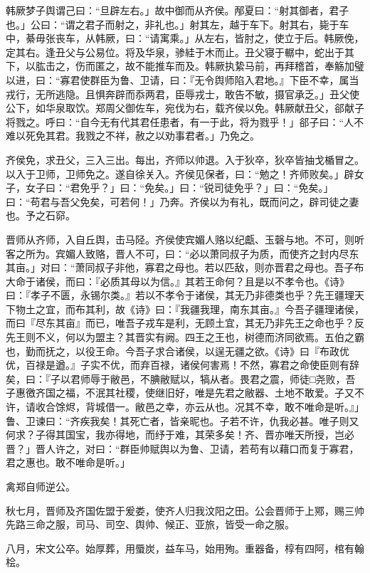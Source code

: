 \documentclass[]{article}
\begin{document}
韩厥梦子舆谓己曰：``旦辟左右。」故中御而从齐侯。邴夏曰：``射其御者，君子也。」公曰：``谓之君子而射之，非礼也。」射其左，越于车下。射其右，毙于车中，綦毋张丧车，从韩厥，曰：``请寓乘。」从左右，皆肘之，使立于后。韩厥俛，定其右。逢丑父与公易位。将及华泉，骖絓于木而止。丑父寝于轏中，蛇出于其下，以肱击之，伤而匿之，故不能推车而及。韩厥执絷马前，再拜稽首，奉觞加璧以进，曰：``寡君使群臣为鲁、卫请，曰：『无令舆师陷入君地。』下臣不幸，属当戎行，无所逃隐。且惧奔辟而忝两君，臣辱戎士，敢告不敏，摄官承乏。」丑父使公下，如华泉取饮。郑周父御佐车，宛伐为右，载齐侯以免。韩厥献丑父，郤献子将戮之。呼曰：``自今无有代其君任患者，有一于此，将为戮乎！」郤子曰：``人不难以死免其君。我戮之不祥，赦之以劝事君者。」乃免之。

齐侯免，求丑父，三入三出。每出，齐师以帅退。入于狄卒，狄卒皆抽戈楯冒之。以入于卫师，卫师免之。遂自徐关入。齐侯见保者，曰：``勉之！齐师败矣。」辟女子，女子曰：``君免乎？」曰：``免矣。」曰：``锐司徒免乎？」曰：``免矣。」曰：``苟君与吾父免矣，可若何！」乃奔。齐侯以为有礼，既而问之，辟司徒之妻也。予之石窌。

晋师从齐师，入自丘舆，击马陉。齐侯使宾媚人赂以纪甗、玉磬与地。不可，则听客之所为。宾媚人致赂，晋人不可，曰：``必以萧同叔子为质，而使齐之封内尽东其亩。」对曰：``萧同叔子非他，寡君之母也。若以匹敌，则亦晋君之母也。吾子布大命于诸侯，而曰：『必质其母以为信。』其若王命何？且是以不孝令也。《诗》曰：『孝子不匮，永锡尔类。』若以不孝令于诸侯，其无乃非德类也乎？先王疆理天下物土之宜，而布其利，故《诗》曰：『我疆我理，南东其亩。』今吾子疆理诸侯，而曰『尽东其亩』而已，唯吾子戎车是利，无顾土宜，其无乃非先王之命也乎？反先王则不义，何以为盟主？其晋实有阙。四王之王也，树德而济同欲焉。五伯之霸也，勤而抚之，以役王命。今吾子求合诸侯，以逞无疆之欲。《诗》曰『布政优优，百禄是遒。』子实不优，而弃百禄，诸侯何害焉！不然，寡君之命使臣则有辞矣，曰：『子以君师辱于敝邑，不腆敝赋以，犒从者。畏君之震，师徒□尧败，吾子惠徼齐国之福，不泯其社稷，使继旧好，唯是先君之敝器、土地不敢爱。子又不许，请收合馀烬，背城借一。敝邑之幸，亦云从也。况其不幸，敢不唯命是听。』」鲁、卫谏曰：``齐疾我矣！其死亡者，皆亲昵也。子若不许，仇我必甚。唯子则又何求？子得其国宝，我亦得地，而纾于难，其荣多矣！齐、晋亦唯天所授，岂必晋？」晋人许之，对曰：``群臣帅赋舆以为鲁、卫请，若苟有以藉口而复于寡君，君之惠也。敢不唯命是听。」

禽郑自师逆公。

秋七月，晋师及齐国佐盟于爰娄，使齐人归我汶阳之田。公会晋师于上鄍，赐三帅先路三命之服，司马、司空、舆帅、候正、亚旅，皆受一命之服。

八月，宋文公卒。始厚葬，用蜃炭，益车马，始用殉。重器备，椁有四阿，棺有翰桧。
\end{document}
